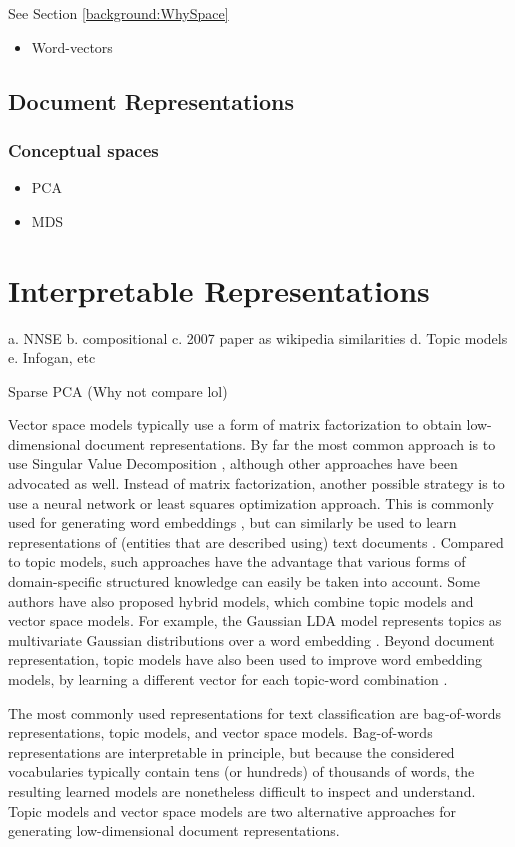 See Section \ref{background:WhySpace}\begin{itemize}
	\item Word-vectors
\end{itemize}
\subsection{Document Representations}
\subsubsection{Conceptual spaces}
\begin{itemize}
	\item PCA %
	\item MDS
\end{itemize}
\section{Interpretable Representations}
a. NNSE
b. compositional
c. 2007 paper as wikipedia similarities
d. Topic models
e. Infogan, etc

\cite{Zhang2012} Sparse PCA (Why not compare lol)

Vector space models typically use a form of matrix factorization to obtain low-dimensional document representations. By far the most common approach is to use Singular Value Decomposition \cite{ASI:ASI1}, although other approaches have been advocated as well. 
Instead of matrix factorization, another possible strategy is to use a neural network or least squares optimization approach. This is commonly used for generating word embeddings \cite{DBLP:conf/nips/MikolovSCCD13,glove2014}, but can similarly be used to learn representations of (entities that are described using) text documents \cite{DBLP:journals/corr/DaiOL15,van2016learning,DBLP:conf/sigir/JameelBS17}. Compared to topic models, such approaches have the advantage that various forms of domain-specific structured knowledge can easily be taken into account. Some authors have also proposed hybrid models, which combine topic models and vector space models. For example, the Gaussian LDA model represents topics as multivariate Gaussian distributions over a word embedding \cite{DBLP:conf/acl/DasZD15}. Beyond document representation, topic models have also been used to improve word embedding models, by learning a different vector for each topic-word combination \cite{DBLP:conf/aaai/LiuLCS15}. %

The most commonly used representations for text classification are bag-of-words representations, topic models, and vector space models. Bag-of-words representations are interpretable in principle, but because the considered vocabularies typically contain tens (or hundreds) of thousands of words, the resulting learned models are nonetheless difficult to inspect and understand. Topic models and vector space models are two alternative approaches for generating low-dimensional document representations. %


